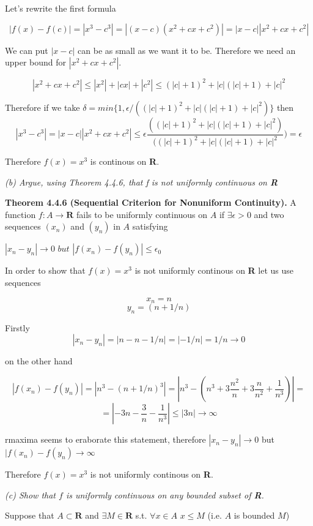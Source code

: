 \documentclass[11pt,oneside,titlepage]{book}
\begin{document}
Let's rewrite the first formula

$$ |f(x) - f(c)| = |x^{3} - c^{3}| = |(x - c)(x^{2} + cx + c^{2})| =
|x - c||x^{2} + cx + c^{2}|$$

We can put $|x - c|$ can be as small as we want it to be. Therefore we need
an upper bound for $|x^{2} + cx + c^{2}|$.

$$|x^{2} + cx + c^{2}| \leq |x^{2}| + |cx| + |c^{2}| \leq (|c| + 1)^{2} +
|c|(|c| + 1) + |c|^{2}$$



Therefore if we take
$\delta = min\{1, \epsilon/((|c| + 1)^{2} + |c|(|c| + 1) + |c|^{2})\}$
then
$$|x^3 - c^3| = |x-c||x^2 + cx + c^2| \leq \epsilon \frac{((|c| + 1)^{2} +
  |c|(|c| + 1) + |c|^{2}) }{ ((|c| + 1)^{2} + |c|(|c| + 1) + |c|^{2}})
= \epsilon$$

Therefore $f(x) = x ^3$ is continous on \textbf{R}.

\textit{(b) Argue, using Theorem 4.4.6, that f is not uniformly continuous
  on \textbf{R}}


\textbf{Theorem 4.4.6 (Sequential Criterion for Nonuniform Continuity).} A
function $f:A \to \textbf{R}$ fails to be uniformly continuous on $A$ if
$\exists \epsilon > 0 $ and  two sequences $(x_n)$ and $(y_n)$ in $A$
satisfying

$|x_n - y_n| \to 0$ $but$ $|f(x_n) - f(y_n)| \leq \epsilon_0$

In order to show that $f(x) = x^3$ is not uniformly continous on
\textbf{R} let us use sequences

$$x_n = n$$
$$y_n = (n + 1/n)$$

Firstly
$$ |x_n - y_n| = |n - n - 1/n| = |-1/n| = 1/n \to 0$$

on the other hand

$$|f(x_n) - f(y_n)| = |n ^ 3 - (n + 1/n) ^ 3| = |n^3 - (n^3 + 3 \frac{n^2}{n}
+ 3 \frac{n}{n^2} + \frac{1}{n^3})| = $$
$$ = |-3n - \frac{3}{n} - \frac{1}{n^3} | \leq |3n| \to \infty$$

rmaxima seems to eraborate this statement, therefore  $|x_n - y_n| \to 0$
but $|f(x_n) - f(y_n) \to \infty$

Therefore $f(x) = x^3$ is not uniformly continous on \textbf{R}.

\textit{(c) Show that $f$ is uniformly continuous on any bounded subset
  of \textbf{R}.}

Suppose that $A \subset \textbf{R}$ and $\exists M \in \textbf{R}$ s.t.
$\forall x \in A$ $x \leq M$ (i.e. $A$ is bounded $M$)
\end{document}
